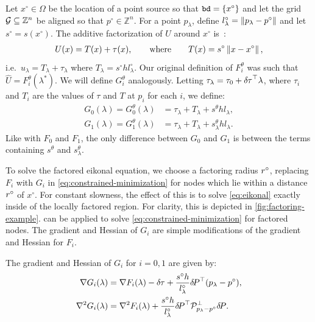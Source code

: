 \documentclass[sisc-eikonal.tex]{subfiles}
\begin{document}
Let $x^\circ \in \Omega$ be the location of a point source so that
$\texttt{bd} = \left\{x^\circ\right\}$ and let the grid
$\mathcal{G} \subseteq \mathbb{Z}^n$ be aligned so that
$p^\circ \in \mathbb{Z}^n$. For a point $p_\lambda$, define
$l^\circ_\lambda = \left\|p_\lambda - p^\circ\right\|$ and let
$s^\circ = s(x^\circ)$. The additive factorization of $U$ around
$x^\circ$ is~\cite{luo2012fast,qi2018corner}:
\begin{align}
  U(x) = T(x) + \tau(x), \qquad \text{where} \qquad T(x) = s^\circ \left\|x - x^\circ\right\|,
\end{align}
i.e.\ $u_\lambda = T_\lambda + \tau_\lambda$ where
$T_\lambda = s^\circ h l^\circ_\lambda$. Our original definition of
$F_i^\theta$ was such that $\hat{U} = F_i^\theta(\lambda^*)$. We will
define $G_i^\theta$ analogously. Letting
$\tau_\lambda = \tau_0 + {\delta \hspace{-0.05em} \tau}^\top \lambda$, where $\tau_i$ and
$T_i$ are the values of $\tau$ and $T$ at $p_i$ for each $i$, we
define:
\begin{align}
  \label{eq:Gi}
  G_0(\lambda) = G_0^\theta(\lambda) &= \tau_\lambda + T_\lambda + s^\theta h l_\lambda, \\
  G_1(\lambda) = G_1^\theta(\lambda) &= \tau_\lambda + T_\lambda + s^\theta_\lambda h l_\lambda.
\end{align}
Like with $F_0$ and $F_1$, the only difference between
$G_0$ and $G_1$ is between the terms containing
$s^\theta$ and $s^\theta_\lambda$.

To solve the factored eikonal equation, we choose a factoring radius
$r^\circ$, replacing $F_i$ with $G_i$ in
\cref{eq:constrained-minimization} for nodes which lie within a
distance $r^\circ$ of $x^\circ$. For constant slowness, the effect of
this is to solve \cref{eq:eikonal} exactly inside of the locally
factored region. For clarity, this is depicted in
\cref{fig:factoring-example}.  can be applied to
solve \cref{eq:constrained-minimization} for factored nodes. The
gradient and Hessian of $G_i$ are simple modifications of the gradient
and Hessian for $F_i$.

\begin{lemma}
  The gradient and Hessian of $G_i$ for $i = 0, 1$ are given
  by:
  \begin{align}
    \label{eq:G-grad-hess}
    \nabla G_i(\lambda) &= \nabla F_i(\lambda) - \deltau + \frac{s^\circ h}{l^\circ_\lambda} \delP^\top {(p_\lambda - p^\circ)}, \\
    \nabla^2 G_i(\lambda) &= \nabla^2 F_i(\lambda) + \frac{s^\circ h}{l^\circ_\lambda} \delP^\top \calP^\perp_{p_\lambda - p^\circ} \delP.
  \end{align}
\end{lemma}
\end{document}
